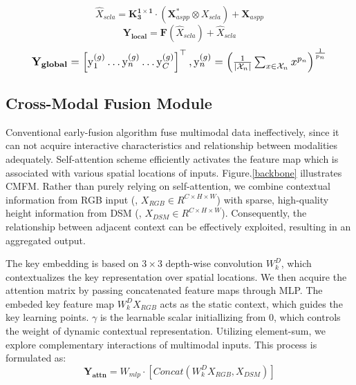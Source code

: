 \documentclass[lettersize,journal]{IEEEtran}
\begin{document}
\begin{equation}
    \hat{X}_{scla} =  \mathbf{K_{3}^{1\times 1}} \cdot (\mathbf{X}_{aspp}^{*} \otimes X_{scla})+ \mathbf{X}_{aspp}
    \label{eqFuse}
\end{equation}
\begin{equation}
    \mathbf{Y_{local}} = {\mathbf{F}}(\hat{X}_{scla}) +\hat{X}_{scla}
    \label{eqOutput}
\end{equation}
    \begin{equation}
    \resizebox{0.91\hsize}{!}{ $  \mathbf{Y_{global}}=\left[\mathrm{y}_{1}^{(g)} \ldots \mathrm{y}_{n}^{(g)} \ldots \mathrm{y}_{C}^{(g)}\right]^{\top},\mathrm{y}_{n}^{(g)}=\left(\frac{1}{\left|\mathcal{X}_{n}\right|} \sum_{x \in \mathcal{X}_{n}} x^{p_{n}}\right)^{\frac{1}{p_{n}}} $  }
        \label{eqGEM}
    \end{equation}

\subsection{Cross-Modal Fusion Module}
Conventional early-fusion algorithm fuse multimodal data ineffectively, since it can not acquire interactive characteristics and relationship between modalities adequately. Self-attention scheme efficiently activates the feature map which is associated with various spatial locations of inputs. Figure.\ref{backbone} illustrates CMFM. Rather than purely relying on self-attention, we combine contextual information from RGB input (, $X_{RGB}\in R^{C\times H \times W}$) with sparse, high-quality height information from DSM (, $X_{DSM}\in R^{C\times H \times W}$).  Consequently,  the relationship between adjacent context can be effectively exploited, resulting in an aggregated output.

The key embedding is based on $3\times 3$ depth-wise convolution $W_k^{D}$, which contextualizes the key representation over spatial locations. We then acquire the attention matrix   by passing concatenated feature maps through MLP. The embeded key feature map  $W_k^{D} X_{RGB}$ acts as the static context, which guides the key learning points. $\gamma$ is the learnable scalar initiallizing from 0, which controls the weight of dynamic contextual representation. Utilizing element-sum, we explore complementary interactions of multimodal inputs. This process is formulated as:
    \begin{equation}
        \mathbf{Y_{attn}} = W_{mlp} \cdot [Concat(W_k^{D} X_{RGB}, X_{DSM})]
        \label{eqAttn}
    \end{equation}
\end{document}
